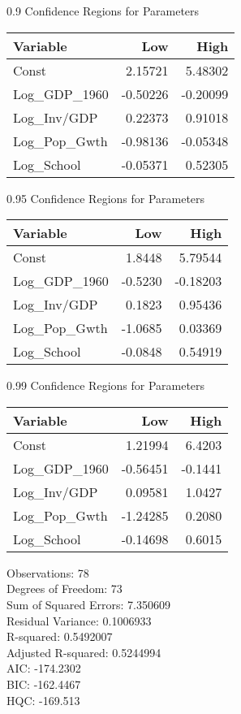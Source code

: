 0.9 Confidence Regions for Parameters \\
\begin{tabular}{l*{2}{r}}
\toprule
Variable    &   Low            &   High \\
\midrule 
Const   &    2.15721   &    5.48302 \\
Log\_GDP\_1960   &   -0.50226   &   -0.20099 \\
Log\_Inv/GDP   &    0.22373   &    0.91018 \\
Log\_Pop\_Gwth   &   -0.98136   &   -0.05348 \\
Log\_School   &   -0.05371   &    0.52305 \\
\bottomrule
\end{tabular}
\bigskip 

0.95 Confidence Regions for Parameters \\
\begin{tabular}{l*{2}{r}}
\toprule
Variable    &   Low            &   High \\
\midrule 
Const   &    1.8448   &    5.79544 \\
Log\_GDP\_1960   &   -0.5230   &   -0.18203 \\
Log\_Inv/GDP   &    0.1823   &    0.95436 \\
Log\_Pop\_Gwth   &   -1.0685   &    0.03369 \\
Log\_School   &   -0.0848   &    0.54919 \\
\bottomrule
\end{tabular}
\bigskip 

0.99 Confidence Regions for Parameters \\
\begin{tabular}{l*{2}{r}}
\toprule
Variable    &   Low            &   High \\
\midrule 
Const   &    1.21994   &    6.4203 \\
Log\_GDP\_1960   &   -0.56451   &   -0.1441 \\
Log\_Inv/GDP   &    0.09581   &    1.0427 \\
Log\_Pop\_Gwth   &   -1.24285   &    0.2080 \\
Log\_School   &   -0.14698   &    0.6015 \\
\bottomrule
\end{tabular}
\bigskip 

Observations:                       78 \\
Degrees of Freedom:                 73 \\
Sum of Squared Errors:              7.350609 \\
Residual Variance:                  0.1006933 \\
R-squared:                          0.5492007 \\
Adjusted R-squared:                 0.5244994 \\
AIC:                                -174.2302 \\
BIC:                                -162.4467 \\
HQC:                                -169.513 \\

